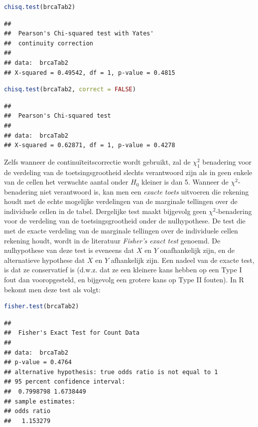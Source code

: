 \documentclass[
  12pt,dutch,coursenotes]{book}
\begin{document}
\begin{lstlisting}[language=R]
chisq.test(brcaTab2)
\end{lstlisting}

\begin{lstlisting}
## 
##  Pearson's Chi-squared test with Yates'
##  continuity correction
## 
## data:  brcaTab2
## X-squared = 0.49542, df = 1, p-value = 0.4815
\end{lstlisting}

\begin{lstlisting}[language=R]
chisq.test(brcaTab2, correct = FALSE)
\end{lstlisting}

\begin{lstlisting}
## 
##  Pearson's Chi-squared test
## 
## data:  brcaTab2
## X-squared = 0.62871, df = 1, p-value = 0.4278
\end{lstlisting}

Zelfs wanneer de continuïteitscorrectie wordt gebruikt, zal de \(\chi^2_1\) benadering voor de verdeling van de toetsingsgrootheid slechts
verantwoord zijn als in geen enkele van de cellen het verwachte aantal onder
\(H_0\) kleiner is dan 5. Wanneer de \(\chi^2\)-benadering niet verantwoord
is, kan men een \emph{exacte toets} uitvoeren die rekening houdt met de
echte mogelijke verdelingen van de marginale tellingen over de individuele
cellen in de tabel. Dergelijke test maakt bijgevolg geen \(\chi^2\)-benadering voor de verdeling van de toetsingsgrootheid onder de
nulhypothese. De test die met de exacte verdeling van de marginale tellingen
over de individuele cellen rekening houdt, wordt in de literatuur \emph{Fisher's exact test} genoemd.
De nulhypothese van deze test is eveneens dat \(X\) en \(Y\) onafhankelijk zijn, en de alternatieve hypothese dat \(X\) en \(Y\)
afhankelijk zijn. Een nadeel van de exacte test, is dat ze conservatief
is (d.w.z. dat ze een kleinere kans hebben op een Type I fout dan
vooropgesteld, en bijgevolg een grotere kans op Type II fouten). In R bekomt men deze test als volgt:

\begin{lstlisting}[language=R]
fisher.test(brcaTab2)
\end{lstlisting}

\begin{lstlisting}
## 
##  Fisher's Exact Test for Count Data
## 
## data:  brcaTab2
## p-value = 0.4764
## alternative hypothesis: true odds ratio is not equal to 1
## 95 percent confidence interval:
##  0.7998798 1.6738449
## sample estimates:
## odds ratio 
##   1.153279
\end{lstlisting}
\end{document}
